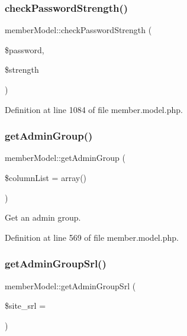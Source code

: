\subsubsection{\texorpdfstring{check\+Password\+Strength()}{checkPasswordStrength()}}
{\footnotesize\ttfamily member\+Model\+::check\+Password\+Strength (\begin{DoxyParamCaption}\item[{}]{\$password,  }\item[{}]{\$strength }\end{DoxyParamCaption})}



Definition at line 1084 of file member.\+model.\+php.

\mbox{\label{classmemberModel_a76c700571e22b4dd519c7b34e0c3a636}} 
\subsubsection{\texorpdfstring{get\+Admin\+Group()}{getAdminGroup()}}
{\footnotesize\ttfamily member\+Model\+::get\+Admin\+Group (\begin{DoxyParamCaption}\item[{}]{\$column\+List = {\ttfamily array()} }\end{DoxyParamCaption})}



Get an admin group. 



Definition at line 569 of file member.\+model.\+php.

\mbox{\label{classmemberModel_ad8c1aafe9a4f461404b596ff6ad3e2ed}} 
\subsubsection{\texorpdfstring{get\+Admin\+Group\+Srl()}{getAdminGroupSrl()}}
{\footnotesize\ttfamily member\+Model\+::get\+Admin\+Group\+Srl (\begin{DoxyParamCaption}\item[{}]{\$site\+\_\+srl = {} }\end{DoxyParamCaption})}



